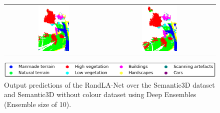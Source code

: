 \begin{figure}[h!]
\begin{tabular}{cc}
            \includegraphics[width=0.33\textwidth, height=0.175\textheight]{images/ood_imgs/de_sem3d/de_class_prob_3.pdf}&
            \includegraphics[width=0.33\textwidth, height=0.175\textheight]{images/sem3d_of/de_sem3d_of_3.pdf}\\
        \end{tabular}
        \includegraphics[scale=0.45]{images/legend.png}
        \caption{Output predictions of the RandLA-Net over the Semantic3D dataset and Semantic3D without colour
         dataset using Deep Ensembles (Ensemble size of 10).}
        \label{fig:deepensemble_vis_sem3d_OF}
    \end{figure}
    
    \FloatBarrier
    

